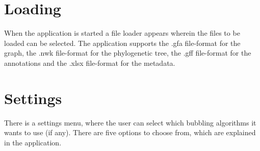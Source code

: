 \section{Loading}
When the application is started a file loader appears wherein the files to be loaded can be selected. The application supports the .gfa file-format for the graph, the .nwk file-format for the phylogenetic tree, the .gff file-format for the annotations and the .xlsx file-format for the metadata. 
\section{Settings}
There is a settings menu, where the user can select which bubbling algorithms it wants to use (if any). There are five options to choose from, which are explained in the application.